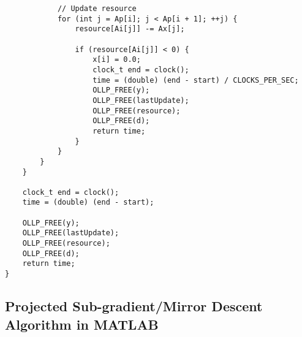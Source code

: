 \documentclass{article}
\begin{document}
\begin{lstlisting}
            // Update resource
            for (int j = Ap[i]; j < Ap[i + 1]; ++j) {
                resource[Ai[j]] -= Ax[j];

                if (resource[Ai[j]] < 0) {
                    x[i] = 0.0;
                    clock_t end = clock();
                    time = (double) (end - start) / CLOCKS_PER_SEC;
                    OLLP_FREE(y);
                    OLLP_FREE(lastUpdate);
                    OLLP_FREE(resource);
                    OLLP_FREE(d);
                    return time;
                }
            }
        }
    }
    
    clock_t end = clock();
    time = (double) (end - start);
    
    OLLP_FREE(y);
    OLLP_FREE(lastUpdate);
    OLLP_FREE(resource);
    OLLP_FREE(d);
    return time;
}

\end{lstlisting}


\subsection{Projected Sub-gradient/Mirror Descent Algorithm in MATLAB}

\end{document}
